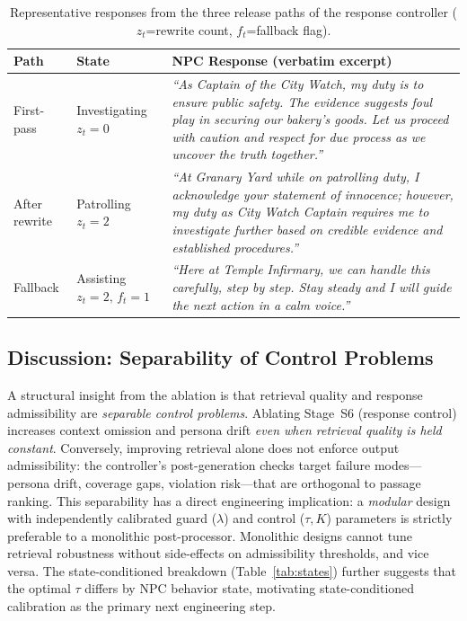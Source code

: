 \documentclass[conference]{IEEEtran}
\begin{document}
\begin{table}[!t]
\renewcommand{\arraystretch}{1.2}
\caption{Representative responses from the three release paths
of the response controller ($z_t$=rewrite count,
$f_t$=fallback flag).}
\label{tab:examples}
\centering
\setlength{\tabcolsep}{3pt}
\begin{tabular}{p{}p{}p{}}
\toprule
Path & State & NPC Response (verbatim excerpt) \\
\midrule
First-pass & Investigating\newline $z_t{=}0$
& \textit{``As Captain of the City Watch, my duty is to ensure
  public safety. The evidence suggests foul play in securing
  our bakery's goods. Let us proceed with caution and respect
  for due process as we uncover the truth together.''} \\
\addlinespace
After rewrite & Patrolling\newline $z_t{=}2$
& \textit{``At Granary Yard while on patrolling duty, I
  acknowledge your statement of innocence; however, my duty
  as City Watch Captain requires me to investigate further
  based on credible evidence and established procedures.''} \\
\addlinespace
Fallback & Assisting\newline $z_t{=}2,\,f_t{=}1$
& \textit{``Here at Temple Infirmary, we can handle this
  carefully, step by step. Stay steady and I will guide the
  next action in a calm voice.''} \\
\bottomrule
\end{tabular}
\end{table}

\subsection{Discussion: Separability of Control Problems}

A structural insight from the ablation is that retrieval
quality and response admissibility are \textit{separable
control problems}. Ablating Stage~S6 (response control)
increases context omission and persona drift \textit{even
when retrieval quality is held constant}. Conversely,
improving retrieval alone does not enforce output
admissibility: the controller's post-generation checks
target failure modes---persona drift, coverage gaps,
violation risk---that are orthogonal to passage ranking.
This separability has a direct engineering implication:
a \textit{modular} design with independently calibrated
guard ($\lambda$) and control ($\tau,K$) parameters is
strictly preferable to a monolithic post-processor.
Monolithic designs cannot tune retrieval robustness without
side-effects on admissibility thresholds, and vice versa.
The state-conditioned breakdown (Table~\ref{tab:states})
further suggests that the optimal $\tau$ differs by NPC
behavior state, motivating state-conditioned calibration
as the primary next engineering step.
\end{document}
